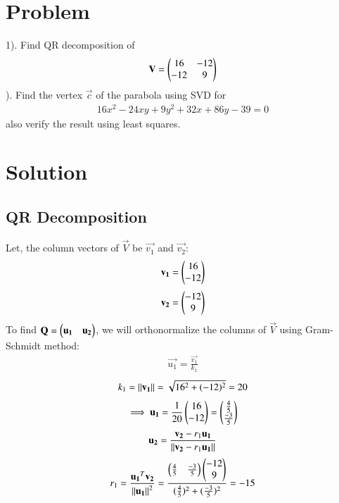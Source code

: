 \documentclass[journal,12pt,twocolumn]{IEEEtran}
\begin{document}
\section{Problem}
1). Find QR decomposition of 
\begin{align}
   \mathbf{V}=\begin{pmatrix}16 & -12 \\ -12 & 9 \end{pmatrix} 
\end{align}
). Find the vertex $\vec{c}$ of the parabola using SVD for
\begin{align}
   16x^2-24xy+9y^2+32x+86y-39=0 \label{eq:conic}
\end{align} \quad also verify the result using least squares.
\section{Solution}
\subsection{QR Decomposition}
Let, the column vectors of $\vec{V}$ be $\vec{v_1}$ and $\vec{v_2}$: 
\begin{align}
   \mathbf{v_1}=\begin{pmatrix}16 \\ -12\end{pmatrix} \label{eq:v1}
\end{align}
\begin{align}
   \mathbf{v_2}=\begin{pmatrix}-12 \\ 9\end{pmatrix} \label{eq:v2}
\end{align}
\quad To find $\mathbf{Q}=\begin{pmatrix}\mathbf{u_1}\quad \mathbf{u_2}\end{pmatrix}$, we will orthonormalize the columns of $\vec{V}$ using Gram-Schmidt method:
\begin{align}
 \vec{u_1}=\frac{\vec{v_1}}{k_1}  \label{eq:u1}
\end{align}
\begin{align}
 k_1=\left\lVert\mathbf{v_1}\right\rVert=\sqrt{16^2+(-12)^2}=20  \label{eq:k1}
\end{align}
\begin{align}
\implies \mathbf{u_1}=\frac{1}{20}\begin{pmatrix}16 \\ -12\end{pmatrix}=\begin{pmatrix}\frac{4}{5}\\ \frac{-3}{5}\end{pmatrix}  \label{eq:u1_1}
\end{align}
\begin{align}
 \mathbf{u_2}=\frac{\mathbf{v_2}-r_1\mathbf{u_1}}{\left\lVert\mathbf{v_2}-r_1\mathbf{u_1}\right\rVert}  \label{eq:u2}
\end{align}
\begin{align}
 r_1=\frac{\mathbf{u_1}^T\mathbf{v_2}}{\left\lVert\mathbf{u_1}\right\rVert^2}=\frac{\begin{pmatrix}\frac{4}{5}\quad \frac{-3}{5}\end{pmatrix}\begin{pmatrix}-12\\9\end{pmatrix}}{(\frac{4}{5})^2+(\frac{-3}{5})^2} = -15 \label{eq:r1}
\end{align}
\end{document}

